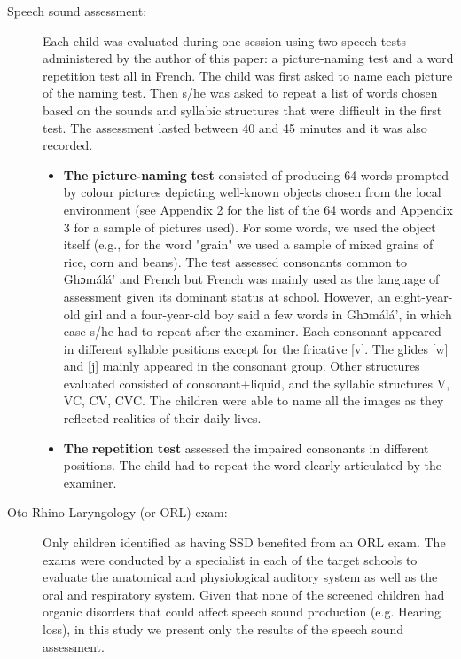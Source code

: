 \documentclass[output=paper,newtxmath,modfonts,nonflat,draftmode]{langsci/langscibook}
\begin{document}
\begin{description}
\item[Speech sound assessment:] Each child was evaluated during one session using two speech tests administered by the author of this paper: a picture-naming test and a word repetition test all in French. The child was first asked to name each picture of the naming test. Then s/he was asked to repeat a list of words chosen based on the sounds and syllabic structures that were difficult in the first test. The assessment lasted between 40 and 45 minutes and it was also recorded.

\begin{itemize}
\item  \textbf{The} \textbf{picture-naming} \textbf{test} consisted of producing 64 words prompted by colour pictures depicting well-known objects chosen from the local environment (see Appendix 2 for the list of the 64 words and Appendix 3 for a sample of pictures used). For some words, we used the object itself (e.g., for the word "grain" we used a sample of mixed grains of rice, corn and beans). The test assessed consonants common to Ghɔmálá’ and French but French was mainly used as the language of assessment given its dominant status at school. However, an eight-year-old girl and a four-year-old boy said a few words in Ghɔmálá’, in which case s/he had to repeat after the examiner. Each consonant appeared in different syllable positions except for the fricative [v]. The glides [w] and [j] mainly appeared in the consonant group. Other structures evaluated consisted of consonant+liquid, and the syllabic structures V, VC, CV, CVC. The children were able to name all the images as they reflected realities of their daily lives.
\item  \textbf{The} \textbf{repetition} \textbf{test} assessed the impaired consonants in different positions. The child had to repeat the word clearly articulated by the examiner.
\end{itemize}

\item[Oto-Rhino-Laryngology (or ORL) exam:] Only children identified as having SSD benefited from an ORL exam. The exams were conducted by a specialist in each of the target schools to evaluate the anatomical and physiological auditory system as well as the oral and respiratory system. Given that none of the screened children had organic disorders that could affect speech sound production (e.g. Hearing loss), in this study we present only the results of the speech sound assessment.
\end{description}
\end{document}
